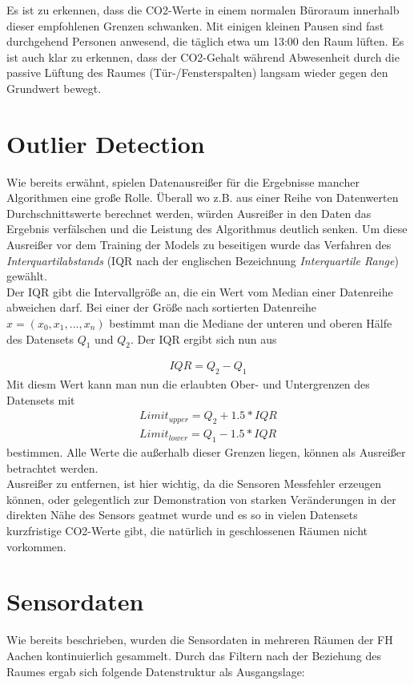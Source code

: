 Es ist zu erkennen, dass die CO2-Werte in einem normalen Büroraum innerhalb dieser empfohlenen Grenzen schwanken.
Mit einigen kleinen Pausen sind fast durchgehend Personen anwesend, die täglich etwa um 13:00 den Raum lüften.
Es ist auch klar zu erkennen, dass der CO2-Gehalt während Abwesenheit durch die passive Lüftung des Raumes  
(Tür-/Fensterspalten) langsam wieder gegen den Grundwert bewegt.

\section{Outlier Detection}
Wie bereits erwähnt, spielen Datenausreißer für die Ergebnisse mancher Algorithmen eine große Rolle. Überall 
wo z.B. aus einer Reihe von Datenwerten Durchschnittswerte berechnet werden, würden Ausreißer in den Daten das 
Ergebnis verfälschen und die Leistung des Algorithmus deutlich senken.
Um diese Ausreißer vor dem Training der Models zu beseitigen wurde das Verfahren des 
\textit{Interquartilabstands} (IQR nach der englischen Bezeichnung \textit{Interquartile Range}) gewählt.\\
Der IQR gibt die Intervallgröße an, die ein Wert vom Median einer Datenreihe abweichen darf. Bei einer 
der Größe nach sortierten Datenreihe $x = (x_0,x_1,...,x_n)$ bestimmt man die Mediane der unteren und oberen 
Hälfe des Datensets $Q_1$ und $Q_2$. Der IQR ergibt sich nun aus 

\begin{align}
    IQR = Q_2 - Q_1
\end{align}
Mit diesm Wert kann man nun die erlaubten Ober- und Untergrenzen 
des Datensets mit 
\begin{align}
    Limit_{upper} = Q_2 + 1.5 * IQR \\
    Limit_{lower} = Q_1 - 1.5 * IQR
\end{align} 
bestimmen. Alle Werte die außerhalb dieser Grenzen liegen, können als Ausreißer betrachtet werden.\\
Ausreißer zu entfernen, ist hier wichtig, da die Sensoren Messfehler erzeugen können, oder gelegentlich zur 
Demonstration von starken Veränderungen in der direkten Nähe des Sensors geatmet wurde und es so in vielen 
Datensets kurzfristige CO2-Werte gibt, die natürlich in geschlossenen Räumen nicht vorkommen.

\section{Sensordaten}
Wie bereits beschrieben, wurden die Sensordaten in mehreren Räumen der FH Aachen kontinuierlich 
gesammelt. Durch das Filtern nach der Beziehung des Raumes ergab sich folgende Datenstruktur als
Ausgangslage:\\

